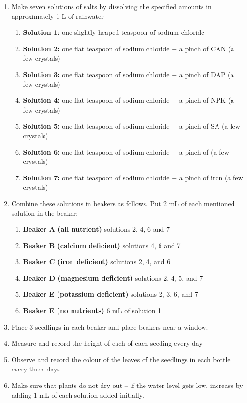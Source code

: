 \begin{enumerate}
\item{Make seven solutions of salts by dissolving the specified amounts in approximately 1 L of rainwater}
\begin{enumerate}
\item{\textbf{Solution 1:} one slightly heaped teaspoon of sodium chloride}
\item{\textbf{Solution 2:} one flat teaspoon of sodium chloride + a pinch of CAN (a few crystals)}
\item{\textbf{Solution 3:} one flat teaspoon of sodium chloride + a pinch of DAP (a few crystals)}
\item{\textbf{Solution 4:} one flat teaspoon of sodium chloride + a pinch of NPK (a few crystals)}
\item{\textbf{Solution 5:} one flat teaspoon of sodium chloride + a pinch of SA (a few crystals)}
\item{\textbf{Solution 6:} one flat teaspoon of sodium chloride + a pinch of  (a few crystals)}
\item{\textbf{Solution 7:} one flat teaspoon of sodium chloride + a pinch of iron (a few crystals)}
\end{enumerate}
\item{Combine these solutions in beakers as follows. Put 2 mL of each mentioned solution in the beaker:}
\begin{enumerate}
\item{\textbf{Beaker A (all nutrient)} solutions 2, 4, 6 and 7}
\item{\textbf{Beaker B (calcium deficient)} solutions 4, 6 and 7}
\item{\textbf{Beaker C (iron deficient)} solutions 2, 4, and 6}
\item{\textbf{Beaker D (magnesium deficient)} solutions 2, 4, 5, and 7}
\item{\textbf{Beaker E (potassium deficient)} solutions 2, 3, 6, and 7}
\item{\textbf{Beaker E (no nutrients)} 6 mL of solution 1}
\end{enumerate}
\item{Place 3 seedlings in each beaker and place beakers near a window.}
\item{Measure and record the height of each of each seeding every day}
\item{Observe and record the colour of the leaves of the seedlings in each bottle every three days.}
\item{Make sure that plants do not dry out -- if the water level gets low, increase by adding 1 mL of each solution added initially.}
\end{enumerate}

